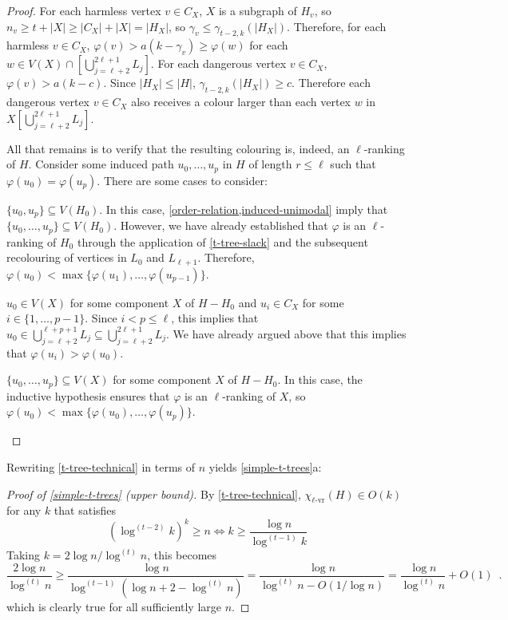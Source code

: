 \documentclass[kpfonts]{patmorin}
\newcommand{\rn}[1]{\chi_{\operatorname{#1-vr}}}
\newcommand{\lrn}{\rn{\ell}}
\theoremstyle{named}
\newcommand{\weirdref}[2]{\cref{#1}#2}
\begin{document}
\begin{proof}
    For each harmless vertex $v\in C_X$, $X$ is a subgraph of $H_v$, so $n_v\ge t+|X|\ge |C_X|+|X|= |H_X|$, so $\gamma_v \le \gamma_{t-2,k}(|H_X|)$. Therefore, for each harmless $v\in C_X$, $\varphi(v)> a(k-\gamma_v)\ge\varphi(w)$ for each $w\in V(X)\cap [\bigcup_{j=\ell+2}^{2\ell+1} L_j]$.  For each dangerous vertex $v\in C_X$, $\varphi(v)>a(k-c)$.  Since $|H_X|\le|H|$, $\gamma_{t-2,k}(|H_X|) \ge c$.  Therefore each dangerous vertex $v\in C_X$ also receives a colour larger than each vertex $w$ in $X[\bigcup_{j=\ell+2}^{2\ell+1} L_j]$.

    All that remains is to verify that the resulting colouring is, indeed, an $\ell$-ranking of $H$.  Consider some induced path $u_0,\ldots,u_p$ in $H$ of length $r\le\ell$ such that $\varphi(u_0)=\varphi(u_p)$.  There are some cases to consider:

    \begin{compactenum}
        \item $\{u_0,u_p\}\subseteq V(H_0)$. In this case, \cref{order-relation,induced-unimodal} imply that $\{u_0,\ldots,u_p\}\subseteq V(H_0)$.  However, we have already established that $\varphi$ is an $\ell$-ranking of $H_0$ through the application of \cref{t-tree-slack} and the subsequent recolouring of vertices in $L_0$ and $L_{\ell+1}$.  Therefore, $\varphi(u_0)<\max\{\varphi(u_1),\ldots,\varphi(u_{p-1})\}$.

        \item $u_0\in V(X)$ for some component $X$ of $H-H_0$ and $u_i\in C_X$ for some $i\in\{1,\ldots,p-1\}$.  Since $i<p\le\ell$, this implies that $u_0\in\bigcup_{j=\ell+2}^{\ell+p+1} L_j\subseteq \bigcup_{j=\ell+2}^{2\ell+1}L_j$.  We have already argued above that this implies that $\varphi(u_i)>\varphi(u_0)$.

        \item $\{u_0,\ldots,u_p\}\subseteq V(X)$ for some component $X$ of $H-H_0$.  In this case, the inductive hypothesis ensures that $\varphi$ is an $\ell$-ranking of $X$, so $\varphi(u_0)<\max\{\varphi(u_0),\ldots,\varphi(u_p)\}$. \qedhere
    \end{compactenum}
\end{proof}

Rewriting \cref{t-tree-technical} in terms of $n$ yields \weirdref{simple-t-trees}{a}:

\begin{proof}[Proof of \cref{simple-t-trees} (upper bound)]
    By \cref{t-tree-technical}, $\lrn(H)\in O(k)$ for any $k$ that satisfies
    \[  (\log^{(t-2)} k)^{k} \ge n \Leftrightarrow
        k \ge \frac{\log n}{\log^{(t-1)} k}
    \]
    Taking $k=2\log n/\log^{(t)} n$, this becomes
    \[
        \frac{2\log n}{\log^{(t)} n}
        \ge \frac{\log n}{\log^{(t-1)}(\log n + 2 -\log^{(t)} n)}
        = \frac{\log n}{\log^{(t)} n - O(1/\log n)}
        = \frac{\log n}{\log^{(t)} n}+O(1) \enspace .
    \]
    which is clearly true for all sufficiently large $n$.
\end{proof}
\end{document}
